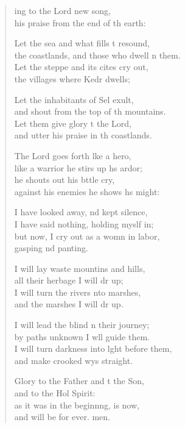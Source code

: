 \settowidth{\versewidth}{I will turn darkness into light before them, *}
\begin{verse}%
  \begin{patverse}
ing to the Lord  new song,\Med\\
his praise from the end of th earth:

Let the sea and what fills \pointup{\i}t resound,\Med\\
the coastlands, and those who dwell \pointup{\i}n them.\\
Let the steppe and its cit\pointup{\i}es cry out,\Med\\
the villages where Kedr dwells;

Let the inhabitants of Sel exult,\Med\\
and shout from the top of th mountains.\\
Let them give glory t the Lord,\Med\\
and utter his praise in th coastlands.

The Lord goes forth l\pointup{\i}ke a hero,\Med\\
like a warrior he stirs up h\pointup{\i}s ardor;\\
he shouts out his bttle cry,\Med\\
against his enemies he shows h\pointup{\i}s might:

I have looked away, nd kept silence,\Med\\
I have said nothing, holding myslf in;\\
but now, I cry out as a womn in labor,\Med\\
gasping nd panting.

I will lay waste mountins and hills,\Med\\
all their herbage I will dr up;\\
I will turn the rivers \pointup{\i}nto marshes,\Med\\
and the marshes I will dr up.

I will lead the blind n their journey;\Med\\
by paths unknown I w\pointup{\i}ll guide them.\\
I will turn darkness into l\pointup{\i}ght before them,\Med\\
and make crooked wys straight.

Glory to the Father and t the Son,\Med\\
    and to the Hol Spirit:\\
as it was in the beginn\pointup{\i}ng, is now,\Med\\
    and will be for ever. men.
  \end{patverse}
\end{verse}
